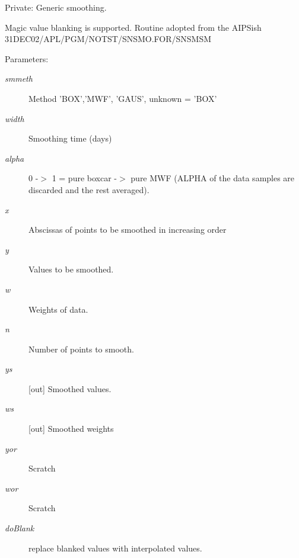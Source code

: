 Private: Generic smoothing. 

Magic value blanking is supported. Routine adopted from the AIPSish 31DEC02/APL/PGM/NOTST/SNSMO.FOR/SNSMSM \begin{Desc}
\item[Parameters:]
\begin{description}
\item[{\em smmeth}]Method 'BOX','MWF', 'GAUS', unknown = 'BOX' \item[{\em width}]Smoothing time (days) \item[{\em alpha}]0 -$>$ 1 = pure boxcar -$>$ pure MWF (ALPHA of the data samples are discarded and the rest averaged). \item[{\em x}]Abscissas of points to be smoothed in increasing order \item[{\em y}]Values to be smoothed. \item[{\em w}]Weights of data. \item[{\em n}]Number of points to smooth. \item[{\em ys}][out] Smoothed values. \item[{\em ws}][out] Smoothed weights \item[{\em yor}]Scratch \item[{\em wor}]Scratch \item[{\em do\-Blank}]replace blanked values with interpolated values. \end{description}
\end{Desc}
